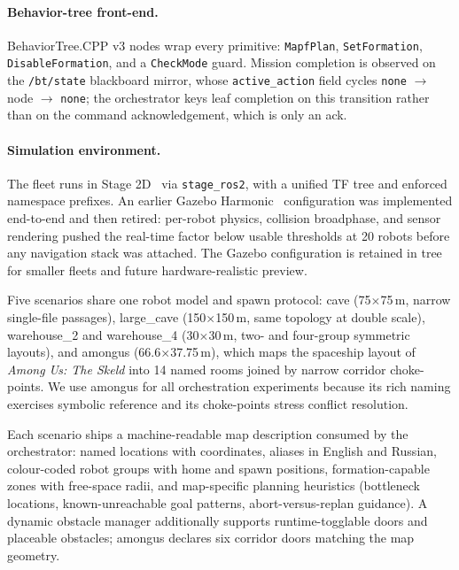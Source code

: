\documentclass[10pt,twocolumn]{article}
\newcommand{\code}[1]{\texttt{\small #1}}
\begin{document}
\paragraph{Behavior-tree front-end.}
BehaviorTree.CPP v3 nodes wrap every primitive: \code{MapfPlan},
\code{SetFormation}, \code{DisableFormation}, and a \code{CheckMode} guard.
Mission completion is observed on the \code{/bt/state} blackboard mirror, whose
\code{active\_action} field cycles \code{none} $\rightarrow$ node $\rightarrow$
\code{none}; the orchestrator keys leaf completion on this transition rather
than on the command acknowledgement, which is only an ack.

\paragraph{Simulation environment.}
The fleet runs in Stage 2D~\cite{stage} via \code{stage\_ros2}, with a unified
TF tree and enforced namespace prefixes. An earlier Gazebo
Harmonic~\cite{gazebo} configuration was implemented end-to-end and then
retired: per-robot physics, collision broadphase, and sensor rendering pushed
the real-time factor below usable thresholds at 20 robots before any navigation
stack was attached. The Gazebo configuration is retained in
tree for smaller fleets and future hardware-realistic preview.

Five scenarios share one robot model and spawn protocol: \textsf{cave}
(75$\times$75\,m, narrow single-file passages), \textsf{large\_cave}
(150$\times$150\,m, same topology at double scale), \textsf{warehouse\_2} and
\textsf{warehouse\_4} (30$\times$30\,m, two- and four-group symmetric layouts),
and \textsf{amongus} (66.6$\times$37.75\,m), which maps the spaceship layout of
\emph{Among Us: The Skeld} into 14 named rooms joined by narrow corridor
choke-points. We use \textsf{amongus} for all orchestration experiments because
its rich naming exercises symbolic reference and its choke-points stress
conflict resolution.

Each scenario ships a machine-readable map description consumed by the
orchestrator: named locations with coordinates, aliases in English and Russian,
colour-coded robot groups with home and spawn positions, formation-capable
zones with free-space radii, and map-specific planning heuristics (bottleneck
locations, known-unreachable goal patterns, abort-versus-replan guidance). A
dynamic obstacle manager additionally supports runtime-togglable doors and
placeable obstacles; \textsf{amongus} declares six corridor doors matching the
map geometry.
\end{document}
